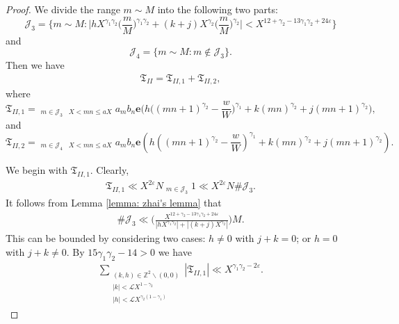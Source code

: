 \documentclass[10pt,a4paper]{amsart}
\newcommand{\ZZ}{\ensuremath{\mathbb{Z}}}
\newcommand{\cL}{\ensuremath{\mathcal{L}}}
\begin{document}
\begin{proof}
	We divide the range $m\sim M$ into the following two parts:
	$$
	\mathcal{J}_3=\bigg\{m\sim M:
	\bigg|hX^{\gamma_1\gamma_2}
	\Big(\frac{m}{M}\Big)^{\gamma_1\gamma_2}
	+(k+j)X^{\gamma_2}\Big(\frac{m}{M}\Big)^{\gamma_2}\bigg|
	<X^{12+\gamma_2-13\gamma_1\gamma_2+24\varepsilon}\bigg\}
	$$
	and
	$$
	\mathcal{J}_4=\{m\sim M: m\notin\mathcal{J}_3\}.
	$$
	Then we have
	\begin{align*}
		\mathfrak{T}_{II}=\mathfrak{T}_{II,1}+\mathfrak{T}_{II,2},
	\end{align*}
	where
	$$
	\mathfrak{T}_{II,1}=\mathop{\sum_{m\sim M}}_{m\in\mathcal{J}_3}\mathop{\sum_{n\sim N}}_{X < mn \leqslant aX}
	a_mb_n\mathbf{e}\Big(h\Big((mn+1)^{\gamma_2}-\frac{w}{W}\Big)^{\gamma_1}
	+k(mn)^{\gamma_2}+j(mn+1)^{\gamma_2}\Big),
	$$
	and
	$$
	\mathfrak{T}_{II,2}=\mathop{\sum_{m\sim M}}_{m\in\mathcal{J}_4}\mathop{\sum_{n\sim N}}_{X < mn \leqslant aX}
	a_mb_n\mathbf{e}\left(h\left((mn+1)^{\gamma_2}-\frac{w}{W}\right)^{\gamma_1}
	+k(mn)^{\gamma_2}+j(mn+1)^{\gamma_2}\right).
	$$
	
	We begin with $\mathfrak{T}_{II,1}$. Clearly,
	\begin{align*}
		\mathfrak{T}_{II,1}\ll X^{2\varepsilon}N\mathop{\sum_{m\sim M}}_{m\in\mathcal{J}_3}1
		\ll X^{2\varepsilon}N\#\mathcal{J}_3.
	\end{align*}
	It follows from Lemma \ref{lemma: zhai's lemma} that
	\begin{align*}
		\#\mathcal{J}_3\ll \bigg(\frac{X^{12+\gamma_2-13\gamma_1\gamma_2+24\varepsilon}}
		{|hX^{\gamma_1\gamma_2}|
			+|(k+j)X^{\gamma_2}|}\bigg)M.
	\end{align*}
This can be bounded by considering two cases: $h\neq0$ with $j+k=0$; or $h=0$
   with $j+k\neq0$. By $15\gamma_1\gamma_2-14>0$ we have
	\begin{align*}
		\sum_{\substack{(k,h) \in \ZZ^2 \backslash (0,0) \\ |k|<\cL X^{1-\gamma_2} \\ |h|<\cL X^{\gamma_2(1-\gamma_1)}}}|\mathfrak{T}_{II,1}|
		\ll X^{\gamma_1\gamma_2-2\varepsilon}.
	\end{align*}
	

\end{proof}
\end{document}
